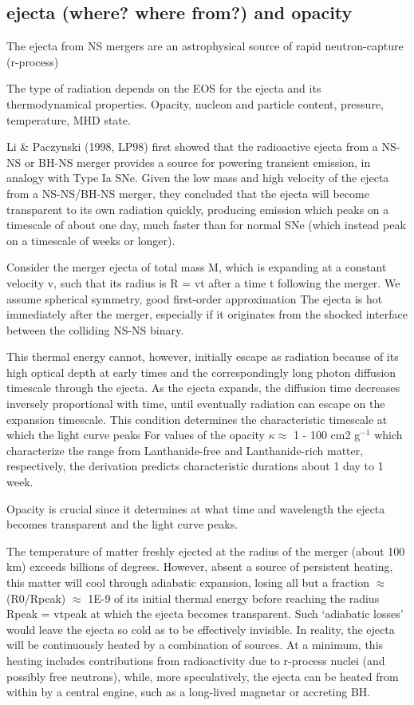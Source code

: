 \subsection{ejecta (where? where from?) and opacity}

The ejecta from NS mergers are an astrophysical source of rapid neutron-capture (r-process) 

The type of radiation depends on the EOS for the ejecta and its thermodynamical properties. Opacity, nucleon and particle content, pressure, temperature, MHD state.

Li \& Paczynski (1998, LP98) first showed that the radioactive ejecta from a NS-NS or BH-NS merger provides a source for powering transient emission, in analogy with Type Ia SNe. Given the low mass and high velocity of the ejecta from a NS-NS/BH-NS merger, they concluded that the ejecta will become transparent to its own radiation quickly, producing emission which peaks on a timescale of about one day, much faster than for normal SNe (which instead peak on a timescale of weeks or longer).

Consider the merger ejecta of total mass M, which is expanding at a constant velocity v, such that its radius is R = vt after a time t following the merger. 
We assume spherical symmetry, good first-order approximation
The ejecta is hot immediately after the merger, especially if it originates from the shocked interface between the colliding NS-NS binary. 

This thermal energy cannot, however, initially escape as radiation because of its high optical depth at early times
and the correspondingly long photon diffusion timescale through the ejecta. 
As the ejecta expands, the diffusion time decreases inversely proportional with time, until eventually radiation can escape on the expansion timescale.
This condition determines the characteristic timescale at which the light curve peaks
For values of the opacity $\kappa \approx$ 1 - 100 cm2 g${}^{-1}$ which characterize the range from Lanthanide-free and Lanthanide-rich matter, respectively, the derivation predicts characteristic durations about 1 day to 1 week.

Opacity is crucial since it determines at what time and wavelength the ejecta becomes transparent and the light curve peaks. 

The temperature of matter freshly ejected at the radius of the merger (about 100 km) exceeds billions of degrees. 
However, absent a source of persistent heating, this matter will cool through adiabatic expansion, losing all but a fraction $\approx$ (R0/Rpeak) $\approx$ 1E-9 of its initial thermal energy before reaching the radius Rpeak = vtpeak at which the ejecta becomes transparent.
Such `adiabatic losses' would leave the ejecta so cold as to be effectively invisible.
In reality, the ejecta will be continuously heated by a combination of sources. 
At a minimum, this heating includes contributions from radioactivity due to r-process nuclei (and possibly free neutrons), while, more speculatively, the ejecta can be heated from within by a central engine, such as a long-lived magnetar or accreting BH.

